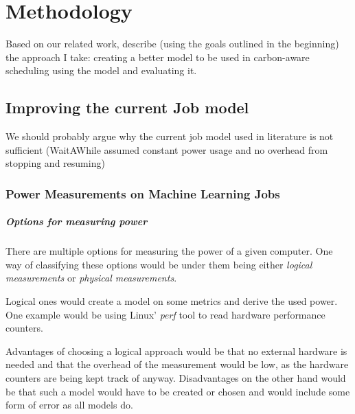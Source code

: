 \chapter{Methodology}

Based on our related work, describe (using the goals outlined in the beginning) the approach I take:
creating a better model to be used in carbon-aware scheduling 
using the model and evaluating it.
\section{Improving the current Job model}

We should probably argue why the current job model used in literature is not sufficient (WaitAWhile\cite{wiesner_lets_2021} assumed constant power usage and no overhead from stopping and resuming)

\subsection{Power Measurements on Machine Learning Jobs}
\label{sec:power_measurements}



\paragraph{Options for measuring power}

There are multiple options for measuring the power of a given computer. One way of classifying these options would be under them being either \emph{logical measurements} or \emph{physical measurements}.

Logical ones would create a model on some metrics and derive the used power. One example would be using Linux' \emph{perf} tool to read hardware performance counters. 

Advantages of choosing a logical approach would be that no external hardware is needed and that the overhead of the measurement would be low, as the hardware counters are being kept track of anyway. Disadvantages on the other hand would be that such a model would have to be created or chosen and would include some form of error as all models do.

